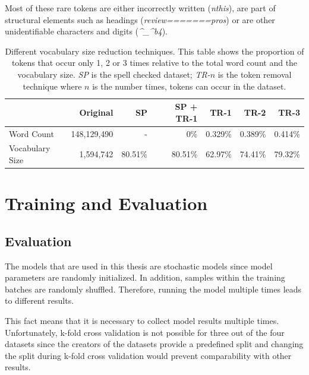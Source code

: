 Most of these rare tokens are either incorrectly written {(\textit{nthis})}, are part of structural elements such as headings {(\textit{review=======pros})} or are other unidentifiable characters and digits ({\textit{\^{}\_\^{}b4}}).

\begin{table}[]
    \centering
    \begin{tabular}{lrrrrrr}
            \toprule
                            & Original      & SP & SP + TR-1 & TR-1 & TR-2 & TR-3 \\
            \midrule
            Word Count      &148,129,490     & -              & 0\%           & 0.329\%         & 0.389\%         & 0.414\%            \\
            Vocabulary Size & 1,594,742       & 80.51\%        & 80.51\%          & 62.97\%         & 74.41\%         & 79.32\%      \\  
            \bottomrule     
    \end{tabular}

    \caption{Different vocabulary size reduction techniques. This table shows the proportion of tokens that occur only 1, 2 or 3 times relative to the total word count and the vocabulary size. \textit{SP} is the spell checked dataset; \textit{TR-}$n$ is the token removal technique where $n$ is the number times, tokens can occur in the dataset.}
    \label{tab:05_amazonVocabSize}
\end{table}

\section{Training and Evaluation}
\label{sec:05_TrainingAndEvaluation}

\subsection{Evaluation}

The models that are used in this thesis are stochastic models since model parameters are randomly initialized. In addition, samples within the training batches are randomly shuffled. Therefore, running the model multiple times leads to different results.
\medskip

This fact means that it is necessary to collect model results multiple times. Unfortunately, k-fold cross validation is not possible for three out of the four datasets since the creators of the datasets provide a predefined split and changing the split during k-fold cross validation would prevent comparability with other results.

